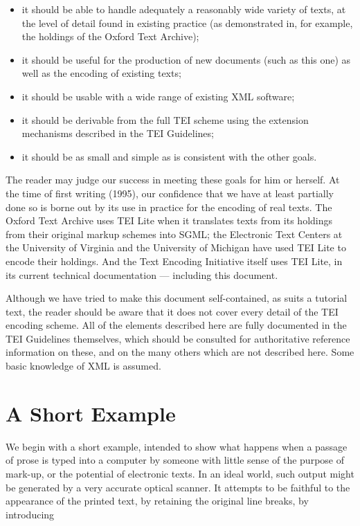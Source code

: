 \documentclass[11pt,twoside]{article}\makeatletter
\makeatletter
\renewcommand\section{\@startsection {section}{1}{\z@}%
     {-1.75ex \@plus -0.5ex \@minus -.2ex}%
     {0.5ex \@plus .2ex}%
     {\reset@font\Large\bfseries\sffamily}}
\def\DivI{\section}
\def\DivI{\chapter}
\makeatother
\begin{document}
\begin{itemize}

\item it should be able to handle adequately a reasonably wide variety
of texts, at the level of detail found in existing practice (as
demonstrated in, for example, the holdings of the Oxford Text
Archive);
\item it should be useful for the production of new documents (such as
this one) as well as the encoding of existing texts;
\item it should be usable with a wide range of existing XML
software;
\item it should be derivable from the full TEI scheme using the
extension mechanisms described in the TEI Guidelines;
\item it should be as small and simple as is consistent with the
other goals.
\end{itemize} \par The reader may judge our success in meeting these goals for him or
herself. At the time of first writing (1995), our confidence that we
have at least partially done so is borne out by its use in practice
for the encoding of real texts.  The Oxford Text Archive uses TEI Lite
when it translates texts from its holdings from their original markup
schemes into SGML; the Electronic Text Centers at the University of
Virginia and the University of Michigan have used TEI Lite to encode
their holdings. And the Text Encoding Initiative itself uses TEI Lite,
in its current technical documentation — including this
document.
       \par Although we have tried to make this document self-contained, as
suits a tutorial text, the reader should be aware that it does not
cover every detail of the TEI encoding scheme. All of the elements
described here are fully documented in the TEI Guidelines themselves,
which should be consulted for authoritative reference information on
these, and on the many others which are not described here.  Some
basic knowledge of XML is assumed.
\DivI[A Short Example]{A Short Example}\label{U5-eg}\par We begin with a short example, intended to show what happens when
a passage of prose is typed into a computer by someone with little
sense of the purpose of mark-up, or the potential of electronic texts.
In an ideal world, such output might be generated by a very accurate
optical scanner.  It attempts to be faithful to the appearance of the
printed text, by retaining the original line breaks, by introducing
\end{document}
